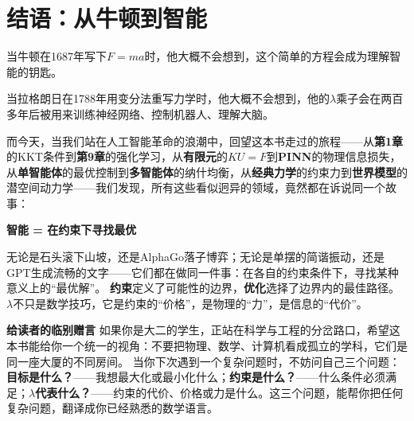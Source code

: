 \section*{结语：从牛顿到智能}
\vspace{0.5cm}

当牛顿在1687年写下$F = ma$时，他大概不会想到，这个简单的方程会成为理解智能的钥匙。

\vspace{0.3cm}

当拉格朗日在1788年用变分法重写力学时，他大概不会想到，他的$\lambda$乘子会在两百多年后被用来训练神经网络、控制机器人、理解大脑。

\vspace{0.3cm}

而今天，当我们站在人工智能革命的浪潮中，回望这本书走过的旅程——从\textbf{第1章}的KKT条件到\textbf{第9章}的强化学习，从\textbf{有限元}的$KU=F$到\textbf{PINN}的物理信息损失，从\textbf{单智能体}的最优控制到\textbf{多智能体}的纳什均衡，从\textbf{经典力学}的约束力到\textbf{世界模型}的潜空间动力学——我们发现，所有这些看似迥异的领域，竟然都在诉说同一个故事：
\begin{keyformula}[title=全书的核心信息]
\begin{center}
\Large
\textbf{智能 = 在约束下寻找最优}
\end{center}
\vspace{0.3cm}
无论是石头滚下山坡，还是AlphaGo落子博弈；无论是单摆的简谐振动，还是GPT生成流畅的文字——它们都在做同一件事：在各自的约束条件下，寻找某种意义上的“最优解”。
\vspace{0.3cm}
\textbf{约束}定义了可能性的边界，\textbf{优化}选择了边界内的最佳路径。
\textbf{$\lambda$}不只是数学技巧，它是约束的“价格”，是物理的“力”，是信息的“代价”。
\end{keyformula}
\vspace{0.5cm}
\begin{philosophy}
\textbf{给读者的临别赠言}
\vspace{0.3cm}
如果你是大二的学生，正站在科学与工程的分岔路口，希望这本书能给你一个统一的视角：不要把物理、数学、计算机看成孤立的学科，它们是同一座大厦的不同房间。
\vspace{0.3cm}
当你下次遇到一个复杂问题时，不妨问自己三个问题：\textbf{目标是什么？}——我想最大化或最小化什么；\textbf{约束是什么？}——什么条件必须满足；\textbf{$\lambda$代表什么？}——约束的代价、价格或力是什么。这三个问题，能帮你把任何复杂问题，翻译成你已经熟悉的数学语言。
\end{philosophy}